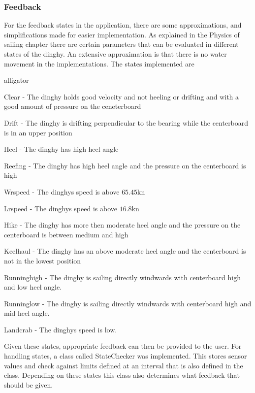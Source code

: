 \subsubsection{Feedback}
For the feedback states in the application, there are some approximations, and simplifications made for easier implementation. As explained in the Physics of sailing chapter there are certain parameters that can be evaluated in different states of the dinghy. An extensive approximation is that there is no water movement in the implementations. The states implemented are
\begin{labeling}{alligator}
\item [Clear] - The dinghy holds good velocity and not heeling or drifting and with a good amount of pressure on the ceneterboard
\item [Drift] - The dinghy is drifting perpendicular to the bearing while the centerboard is in an upper position
\item [Heel] - The dinghy has high heel angle
\item [Reefing] - The dinghy has high heel angle and the pressure on the centerboard is high
\item [Wrspeed] - The dinghys speed is above $65.45$kn
\item [Lrspeed] - The dinghys speed is above $16.8$kn
\item [Hike] - The dinghy has more then moderate heel angle and the pressure on the centerboard is between medium and high
\item [Keelhaul] - The dinghy has an above moderate heel angle and the centerboard is not in the lowest position
\item [Runninghigh] - The dinghy is sailing directly windwards with centerboard high and low heel angle.
\item [Runninglow] - The dinghy is sailing directly windwards with centerboard high and mid heel angle.
\item [Landcrab] - The dinghys speed is low.
\end{labeling}
Given these states, appropriate feedback can then be provided to the user. For handling states, a class called StateChecker was implemented. This stores sensor values and check against limits defined at an interval that is also defined in the class. Depending on these states this class also determines what feedback that should be given.

